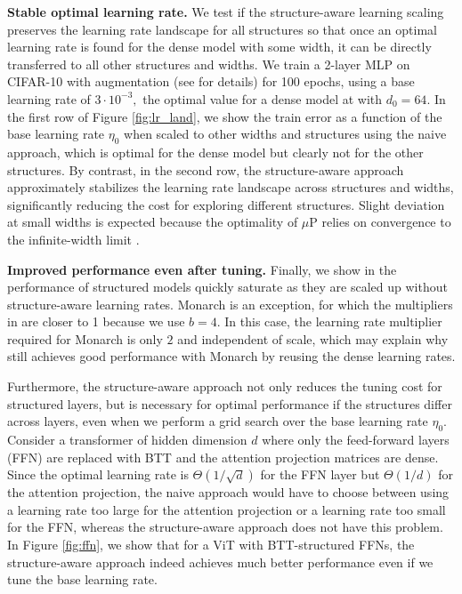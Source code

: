 \documentclass{article}
\theoremstyle{plain}
\theoremstyle{definition}
\theoremstyle{remark}
\newcommand{\mup}{$\mu$P\xspace}
\begin{document}
%
%
%
%
%
%
%
%
%
%
%
%
%

\noindent \textbf{Stable optimal learning rate.} We test if the structure-aware learning scaling preserves the learning rate landscape for all structures so that once an optimal learning rate is found for the dense model with some width, it can be directly transferred to all other structures and widths. We train a 2-layer MLP on CIFAR-10 with augmentation (see  for details) for 100 epochs, using a base learning rate of $3 \cdot 10^{-3},$ the optimal value for a dense model at with $d_0=64$. In the first row of Figure \ref{fig:lr_land}, we show the train error as a function of the base learning rate $\eta_0$ when scaled to other widths and structures using the naive approach, which is optimal for the dense model but clearly not for the other structures. By contrast, in the second row, the structure-aware approach approximately stabilizes the learning rate landscape across structures and widths, significantly reducing the cost for exploring different structures. Slight deviation at small widths is expected because the optimality of \mup relies on convergence to the infinite-width limit \citep{yang2021infty}.


\noindent \textbf{Improved performance even after tuning.} Finally, we show in  the performance of structured models quickly saturate as they are scaled up without structure-aware learning rates. Monarch is an exception, for which the multipliers in  are closer to 1 because we use $b=4$. In this case, the learning rate multiplier required for Monarch is only $2$ and independent of scale, which may explain why \citet{dao2022monarch} still achieves good performance with Monarch by reusing the dense learning rates.

Furthermore, the structure-aware approach not only reduces the tuning cost for structured layers, but is necessary for optimal performance if the structures differ across layers, even when we perform a grid search over the base learning rate $\eta_0$. Consider a transformer of hidden dimension $d$ where only the feed-forward layers (FFN) are replaced with BTT and the attention projection matrices are dense. Since the optimal learning rate is $\Theta(1/\sqrt{d})$ for the FFN layer but $\Theta(1/d)$ for the attention projection, the naive approach would have to choose between using a learning rate too large for the attention projection or a learning rate too small for the FFN, whereas the structure-aware approach does not have this problem. In Figure \ref{fig:ffn}, we show that for a ViT with BTT-structured FFNs, the structure-aware approach indeed achieves much better performance even if we tune the base learning rate.
\end{document}
